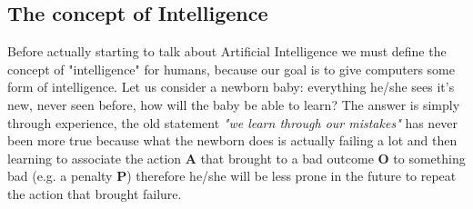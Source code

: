\documentclass[11pt,a4paper,titlepage]{book}
\begin{document}
\subsection{The concept of Intelligence}
Before actually starting to talk about Artificial Intelligence we must define the concept of "intelligence" for humans, because our goal is to give computers some form of intelligence. Let us consider a newborn baby: everything he/she sees it's new, never seen before, how will the baby be able to learn?
\newline
\newline
The answer is simply through experience, the old statement \textit{"we learn through our mistakes"} has never been more true because what the newborn does is actually failing a lot and then learning to associate the action \textbf{A} that brought to a bad outcome \textbf{O} to something bad (e.g. a penalty \textbf{P}) therefore he/she will be less prone in the future to repeat the action that brought failure.
\end{document}
